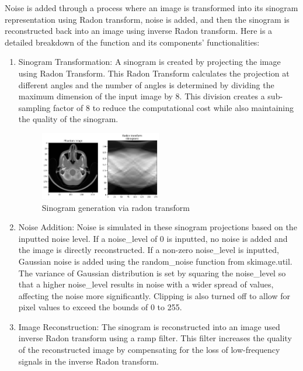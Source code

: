 \documentclass{article}
\begin{document}
\begin{par}
    Noise is added through a process where an image is transformed into its sinogram representation using Radon transform, noise is added, and then the sinogram is reconstructed back into an image using inverse Radon transform. Here is a detailed breakdown of the function and its components' functionalities:
    \begin{enumerate}
    \item Sinogram Transformation:
    A sinogram is created by projecting the image using Radon Transform. This Radon Transform calculates the projection at different angles and the number of angles is determined by dividing the maximum dimension of the input image by 8. This division creates a sub-sampling factor of 8 to reduce the computational cost while also maintaining the quality of the sinogram.
    
    \begin{figure}[h]
        \centering
        \includegraphics[width=0.5\textwidth]{sinogram.png}
        \caption{Sinogram generation via radon transform} 
    \end{figure}
    
    \item Noise Addition:
    Noise is simulated in these sinogram projections based on the inputted noise level. If a noise\_level of 0 is inputted, no noise is added and the image is directly reconstructed. If a non-zero noise\_level is inputted, Gaussian noise is added using the random\_noise function from skimage.util. The variance of Gaussian distribution is set by squaring the noise\_level so that a higher noise\_level results in noise with a wider spread of values, affecting the noise more significantly. Clipping is also turned off to allow for pixel values to exceed the bounds of 0 to 255.
    
    \item Image Reconstruction:
    The sinogram is reconstructed into an image used inverse Radon transform using a ramp filter. This filter increases the quality of the reconstructed image by compensating for the loss of low-frequency signals in the inverse Radon transform.
    

\end{enumerate}
\end{par}
\end{document}

